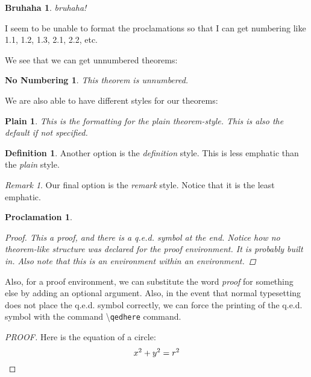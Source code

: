 \documentclass[12pt]{amsart}
\theoremstyle{plain}
\newtheorem{name of environment}{Typeset Proclamation} %
\newtheorem*{no numbering}{No Numbering}
\newtheorem{proclamation}{Proclamation}[section]
\newtheorem{bruhaha}[haha]{Bruhaha}
\newtheorem{plain}{Plain}
\theoremstyle{definition}
\newtheorem{definition}{Definition}
\theoremstyle{remark}
\newtheorem{remark}{Remark}
\begin{document}
\begin{bruhaha}
bruhaha!
\end{bruhaha}
I seem to be unable to format the proclamations so that I can get numbering like 1.1, 1.2, 1.3, 2.1, 2.2, etc.
\vspace{12pt}

We see that we can get unnumbered theorems:
\begin{no numbering}
This theorem is unnumbered.
\end{no numbering}
We are also able to have different styles for our theorems:
\begin{plain}
This is the formatting for the \emph{plain} theorem-style. This is also the default if not specified.
\end{plain}
\begin{definition}
Another option is the \emph{definition} style. This is less emphatic than the \emph{plain} style.
\end{definition}
\begin{remark}
Our final option is the \emph{remark} style. Notice that it is the least emphatic.
\end{remark}
\begin{proclamation} \hfill
\begin{proof}
This a proof, and there is a q.e.d. symbol at the end. Notice how no theorem-like structure was declared for the proof environment. It is probably built in. Also note that this is an environment within an environment. 
\end{proof}
\end{proclamation}
Also, for a proof environment, we can substitute the word \emph{proof} for something else by adding an optional argument. Also, in the event that normal typesetting does not place the q.e.d. symbol correctly, we can force the printing of the q.e.d. symbol with the command \textbackslash \texttt{qedhere} command. 
\begin{proof}[PROOF]
Here is the equation of a circle:
\[
x^2 + y^2 = r^2 \qedhere
\]
\end{proof}
\vspace{12pt}
\end{document}
